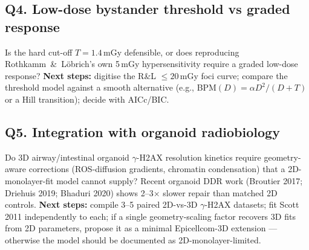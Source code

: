 \subsection*{Q4. Low-dose bystander threshold vs graded response}
Is the hard cut-off $T = 1.4$\,mGy defensible, or does reproducing
Rothkamm~\&~L\"obrich's own 5\,mGy hypersensitivity require a graded
low-dose response? \textbf{Next steps:} digitise the R\&L $\leq 20$\,mGy
foci curve; compare the threshold model against a smooth alternative
(e.g., BPM$(D) = \alpha D^2/(D+T)$ or a Hill transition); decide with
AICc/BIC.

\subsection*{Q5. Integration with organoid radiobiology}
Do 3D airway/intestinal organoid $\gamma$-H2AX resolution kinetics require
geometry-aware corrections (ROS-diffusion gradients, chromatin condensation)
that a 2D-monolayer-fit model cannot supply? Recent organoid DDR work
(Broutier 2017; Driehuis 2019; Bhaduri 2020) shows 2--3$\times$ slower
repair than matched 2D controls. \textbf{Next steps:} compile 3--5 paired
2D-vs-3D $\gamma$-H2AX datasets; fit Scott 2011 independently to each;
if a single geometry-scaling factor recovers 3D fits from 2D parameters,
propose it as a minimal Epicellcom-3D extension --- otherwise the model
should be documented as 2D-monolayer-limited.
